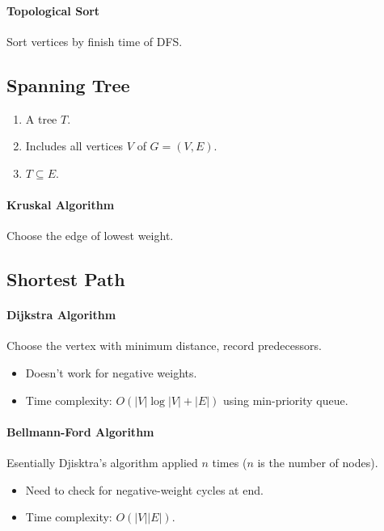 \documentclass[twocolumn,english]{article}
\numberwithin{equation}{section}
\numberwithin{figure}{section}
\numberwithin{table}{section}
\begin{document}
\paragraph{Topological Sort}

Sort vertices by finish time of DFS.

\subsection{Spanning Tree}
\begin{enumerate}
\item A tree $T$.
\item Includes all vertices $V$ of $G=\left(V,E\right)$.
\item $T\subseteq E$.
\end{enumerate}

\paragraph{Kruskal Algorithm}

Choose the edge of lowest weight.

\subsection{Shortest Path}

\paragraph{Dijkstra Algorithm}

Choose the vertex with minimum distance, record predecessors.
\begin{itemize}
\item Doesn't work for negative weights.
\item Time complexity: $O\left(\left|V\right|\log\left|V\right|+\left|E\right|\right)$
using min-priority queue.
\end{itemize}

\paragraph{Bellmann-Ford Algorithm}

Esentially Djisktra's algorithm applied $n$ times ($n$ is the number
of nodes).
\begin{itemize}
\item Need to check for negative-weight cycles at end.
\item Time complexity: $O\left(\left|V\right|\left|E\right|\right)$.
\end{itemize}
\end{document}
